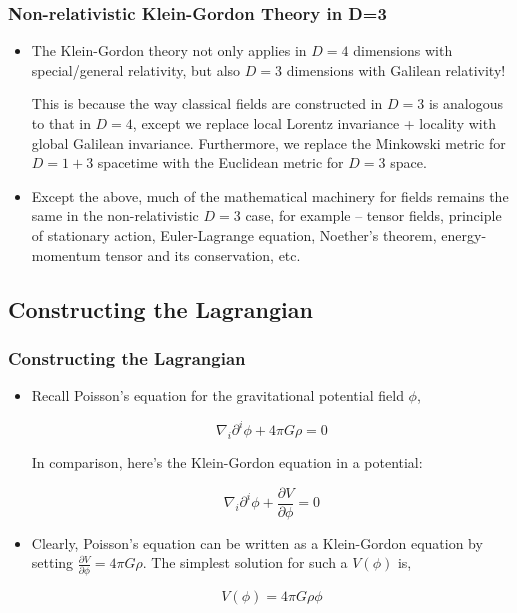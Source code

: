 \documentclass{beamer}
\begin{document}
\begin{frame}
\frametitle{Non-relativistic Klein-Gordon Theory in D=3}

\begin{itemize}
\item The Klein-Gordon theory not only applies in $D=4$ dimensions with special/general relativity, but also $D=3$ dimensions with Galilean relativity! 

This is because the way classical fields are constructed in $D=3$ is analogous to that in $D=4$, except we replace local Lorentz invariance + locality with global Galilean invariance. Furthermore, we replace the Minkowski metric for $D=1+3$ spacetime with the Euclidean metric for $D=3$ space.

\item Except the above, much of the mathematical machinery for fields remains the same in the non-relativistic $D=3$ case, for example -- tensor fields, principle of stationary action, Euler-Lagrange equation, Noether's theorem, energy-momentum tensor and its conservation, etc. 
\end{itemize}
\end{frame}

\subsection{Constructing the Lagrangian}

\begin{frame}
\frametitle{Constructing the Lagrangian}

\begin{itemize}
\item Recall Poisson's equation for the gravitational potential field $\phi$,

$$\nabla_i \partial^i \phi + 4 \pi G \rho = 0$$

In comparison, here's the Klein-Gordon equation in a potential:

$$\nabla_i \partial^i \phi + \frac{\partial V}{\partial \phi} = 0$$

\item Clearly, Poisson's equation can be written as a Klein-Gordon equation by setting $\displaystyle{\frac{\partial V}{\partial \phi} = 4 \pi G \rho}$. The simplest solution for such a $V \left( \phi \right)$ is,

$$V \left( \phi \right) = 4 \pi G \rho \phi$$
\end{itemize}
\end{frame}
\end{document}
